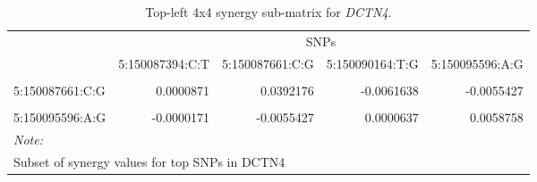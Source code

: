 \begin{table}
\centering
\caption{Top-left 4x4 synergy sub-matrix for \textit{DCTN4}.}
\centering
\begin{tabular}[t]{lrrrr}
\toprule
\multicolumn{1}{c}{ } & \multicolumn{4}{c}{SNPs} \\
\cmidrule(l{3pt}r{3pt}){2-5}
  & 5:150087394:C:T & 5:150087661:C:G & 5:150090164:T:G & 5:150095596:A:G\\
\midrule
\cellcolor{gray!10}{5:150087394:C:T} & \cellcolor{gray!10}{0.0086152} & \cellcolor{gray!10}{0.0000871} & \cellcolor{gray!10}{0.0000423} & \cellcolor{gray!10}{-0.0000171}\\
5:150087661:C:G & 0.0000871 & 0.0392176 & -0.0061638 & -0.0055427\\
\cellcolor{gray!10}{5:150090164:T:G} & \cellcolor{gray!10}{0.0000423} & \cellcolor{gray!10}{-0.0061638} & \cellcolor{gray!10}{0.0374069} & \cellcolor{gray!10}{0.0000637}\\
5:150095596:A:G & -0.0000171 & -0.0055427 & 0.0000637 & 0.0058758\\
\bottomrule
\multicolumn{5}{l}{\rule{0pt}{1em}\textit{Note: }}\\
\multicolumn{5}{l}{\rule{0pt}{1em}Subset of synergy values for top SNPs in DCTN4}\\
\end{tabular}
\end{table}
